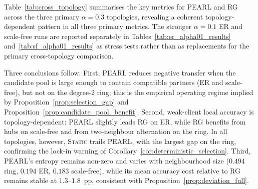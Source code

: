 \documentclass[conference]{IEEEtran}
\begin{document}
Table~\ref{tab:cross_topology} summarises the key metrics for \textsc{PEARL} and \textsc{RG} across the three primary $\alpha=0.3$ topologies, revealing a coherent topology-dependent pattern in all three primary metrics. The stronger $\alpha=0.1$ ER and scale-free runs are reported separately in Tables~\ref{tab:er_alpha01_results} and~\ref{tab:sf_alpha01_results} as stress tests rather than as replacements for the primary cross-topology comparison.

\begin{table}[t]
\centering
\caption{Primary $\alpha=0.3$ cross-topology comparison of \textsc{PEARL} and \textsc{RG}.}
\label{tab:cross_topology}
\scriptsize
\renewcommand{\arraystretch}{1.08}
\setlength{\tabcolsep}{2pt}
\end{table}

Three conclusions follow. First, \textsc{PEARL} reduces negative transfer when the candidate pool is large enough to contain compatible partners (ER and scale-free), but not on the degree-2 ring; this is the empirical operating regime implied by Proposition~\ref{prop:selection_gap} and Proposition~\ref{prop:candidate_pool_benefit}. Second, weak-client local accuracy is topology-dependent: \textsc{PEARL} slightly leads \textsc{RG} on ER, while \textsc{RG} benefits from hubs on scale-free and from two-neighbour alternation on the ring. In all topologies, however, \textsc{Static} trails \textsc{PEARL}, with the largest gap on the ring, confirming the lock-in warning of Corollary~\ref{cor:deterministic_selection}. Third, \textsc{PEARL}'s entropy remains non-zero and varies with neighbourhood size ($0.494$ ring, $0.194$ ER, $0.183$ scale-free), while its mean accuracy cost relative to \textsc{RG} remains stable at $1.3$--$1.8$~pp, consistent with Proposition~\ref{prop:deviation_full}.
\end{document}
